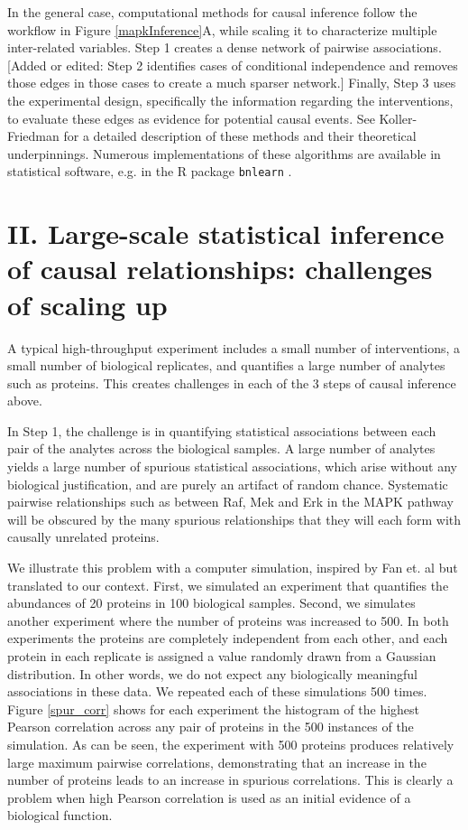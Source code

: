 \documentclass[journal=jacsat,manuscript=article]{achemso}
\def\added#1{{\color{magenta}[Added or edited: #1]}}
\begin{document}
In the general case, computational methods for causal inference follow the workflow  in Figure \ref{mapkInference}A, while scaling it to characterize multiple inter-related variables. Step 1 creates a dense network of pairwise associations. \added{Step 2 identifies cases of conditional independence and removes those edges in those cases to create a much sparser network.}  Finally, Step 3 uses the experimental design, specifically the information regarding the interventions, to evaluate these edges as evidence for potential causal events.  See Koller-Friedman \cite{koller2009probabilistic} for a detailed description of these methods and their theoretical underpinnings. Numerous implementations of these algorithms are available in statistical software, e.g. in the R package {\tt bnlearn} \cite{scutari2009learning}. 

\section{II. Large-scale statistical inference of causal relationships: challenges of scaling up}

A typical high-throughput experiment includes a small number of interventions, a small number of biological replicates, and quantifies a large number of analytes such as proteins. This creates challenges in each of the 3 steps of causal inference above.

In Step 1, the challenge is in quantifying statistical associations between each pair of the analytes across the biological samples. A large number of analytes  yields a large number of spurious statistical associations, which arise without any biological justification, and are purely an artifact of random chance. Systematic pairwise relationships such as between Raf, Mek and Erk in the MAPK pathway will be obscured by the many spurious relationships that they will each form with causally unrelated proteins.

We illustrate this problem with a computer simulation, inspired by Fan et. al \cite{fan2014challenges} but translated to our context. First, we simulated an experiment that quantifies the abundances of 20 proteins in 100 biological samples.  Second, we simulates another experiment where the number of proteins was increased to 500.  In both experiments the proteins are completely independent from each other, and each protein in each replicate is assigned a value randomly drawn from a Gaussian distribution. In other words, we do not expect any biologically meaningful associations in these data. We repeated each of these simulations 500 times. Figure \ref{spur_corr} shows for each experiment the histogram of the highest Pearson correlation across any pair of proteins in the 500 instances of the simulation. As can be seen, the experiment with 500 proteins produces relatively large maximum pairwise correlations, demonstrating that an increase in the number of proteins leads to an increase in spurious correlations.  This is clearly a problem when high Pearson correlation is used as an initial evidence of a biological function.
\end{document}
